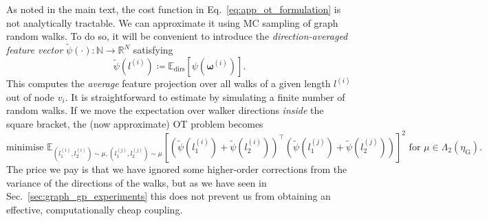 As noted in the main text, the cost function in Eq.~\ref{eq:app_ot_formulation} is not analytically tractable. 
We can approximate it using MC sampling of graph random walks.
To do so, it will be convenient to introduce the \emph{direction-averaged feature vector} $\widetilde{\psi}(\cdot):\mathbb{N} \to \mathbb{R}^N$ satisfying
\begin{equation} \label{eq:dir_av_feat_proj}
    \widetilde{\psi}(l^{(i)}) \coloneqq \mathbb{E}_\textrm{dirs}[\psi( \boldsymbol{\omega}^{(i)})].
\end{equation} 
This computes the \emph{average} feature projection over all walks of a given length $l^{(i)}$ out of node $v_i$.
It is straightforward to estimate by simulating a finite number of random walks. 
If we move the expectation over walker directions \emph{inside} the square bracket, the (now approximate) OT problem becomes
\small
\begin{equation} \label{eq:app_approx_ot_formulation_1}
    \textrm{minimise } \mathbb{E}_{(l_1^{(i)},l_2^{(i)}) \sim \mu, (l_1^{(j)},l_2^{(j)}) \sim \mu}  \left [ \left( \widetilde{\psi}( l_{1}^{(i)}) + \widetilde{\psi}( l_{2}^{(i)}) \right)^\top \left( \widetilde{\psi}( l_{1}^{(j)}) + \widetilde{\psi}( l_{2}^{(j)}) \right) \right]^2 \textrm{ for } \mu \in \Lambda_2(\eta_\textrm{G}). 
\end{equation}
\normalsize
The price we pay is that we have ignored some higher-order corrections from the variance of the directions of the walks, but as we have seen in Sec.~\ref{sec:graph_gp_experiments} this does not prevent us from obtaining an effective, computationally cheap coupling.

